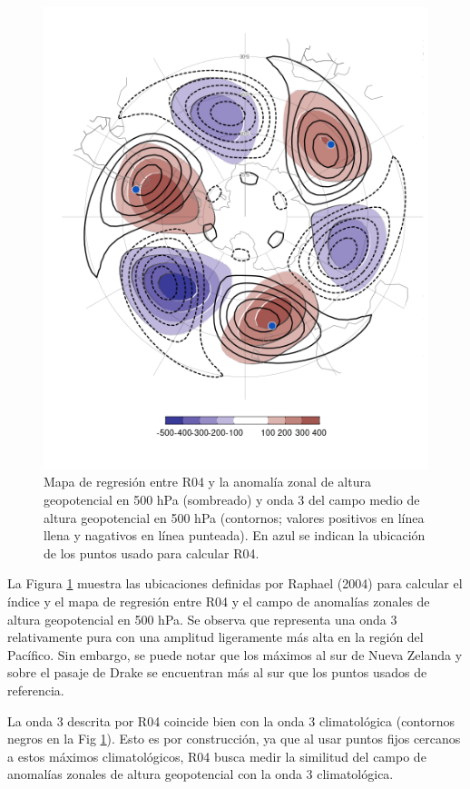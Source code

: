 \documentclass[12pt,oneside]{reedthesis}
\begin{document}
\begin{figure}
\includegraphics{figures/15-onda3/raphael-regr-1} \caption{Mapa de regresión entre R04 y la anomalía zonal de altura geopotencial en 500 hPa (sombreado) y onda 3 del campo medio de altura geopotencial en 500 hPa (contornos; valores positivos en línea llena y nagativos en línea punteada). En azul se indican la ubicación de los puntos usado para calcular R04.}\label{fig:raphael-regr}
\end{figure}



La Figura \ref{fig:raphael-regr} muestra las ubicaciones definidas por Raphael (2004) para calcular el índice y el mapa de regresión entre R04 y el campo de anomalías zonales de altura geopotencial en 500 hPa.
Se observa que representa una onda 3 relativamente pura con una amplitud ligeramente más alta en la región del Pacífico.
Sin embargo, se puede notar que los máximos al sur de Nueva Zelanda y sobre el pasaje de Drake se encuentran más al sur que los puntos usados de referencia.

La onda 3 descrita por R04 coincide bien con la onda 3 climatológica (contornos negros en la Fig \ref{fig:raphael-regr}).
Esto es por construcción, ya que al usar puntos fijos cercanos a estos máximos climatológicos, R04 busca medir la similitud del campo de anomalías zonales de altura geopotencial con la onda 3 climatológica.
\end{document}
